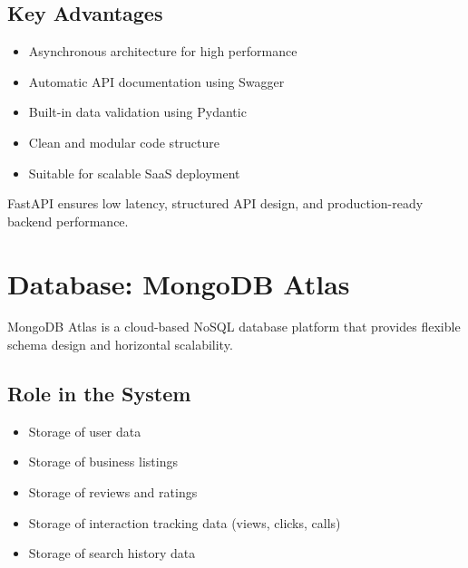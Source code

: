 \documentclass[12pt,a4paper]{report}
\begin{document}
\subsection*{Key Advantages}

\begin{itemize}

\item Asynchronous architecture for high performance

\item Automatic API documentation using Swagger

\item Built-in data validation using Pydantic

\item Clean and modular code structure

\item Suitable for scalable SaaS deployment

\end{itemize}

FastAPI ensures low latency, structured API design, and production-ready backend performance.

\section{Database: MongoDB Atlas}

MongoDB Atlas is a cloud-based NoSQL database platform that provides flexible schema design and horizontal scalability.

\subsection*{Role in the System}

\begin{itemize}

\item Storage of user data

\item Storage of business listings

\item Storage of reviews and ratings

\item Storage of interaction tracking data (views, clicks, calls)

\item Storage of search history data

\end{itemize}
\end{document}
